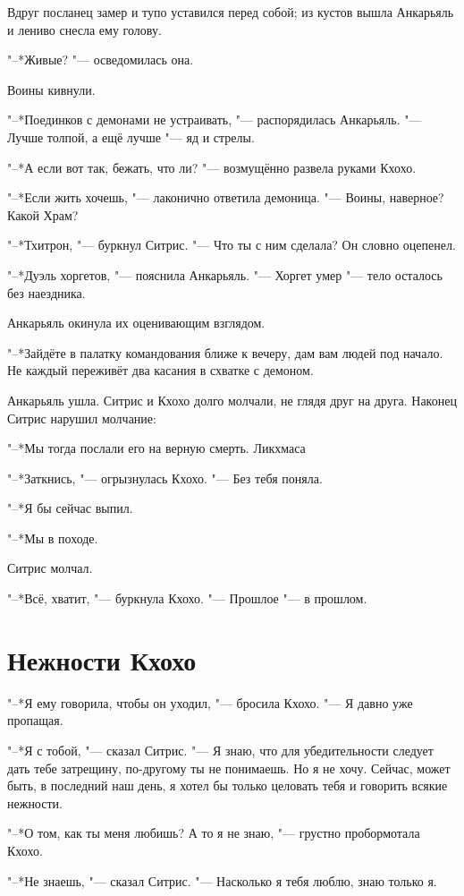 Вдруг посланец замер и тупо уставился перед собой;
из кустов вышла Анкарьяль и лениво снесла ему голову.

"--*Живые? "--- осведомилась она.

Воины кивнули.

"--*Поединков с демонами не устраивать, "--- распорядилась Анкарьяль.
"--- Лучше толпой, а ещё лучше "--- яд и стрелы.

"--*А если вот так, бежать, что ли? "--- возмущённо развела руками Кхохо.

"--*Если жить хочешь, "--- лаконично ответила демоница.
"--- Воины, наверное?
Какой Храм?

"--*Тхитрон, "--- буркнул Ситрис.
"--- Что ты с ним сделала?
Он словно оцепенел.

"--*Дуэль хоргетов, "--- пояснила Анкарьяль.
"--- Хоргет умер "--- тело осталось без наездника.

Анкарьяль окинула их оценивающим взглядом.

"--*Зайдёте в палатку командования ближе к вечеру, дам вам людей под начало.
Не каждый переживёт два касания в схватке с демоном.

Анкарьяль ушла.
Ситрис и Кхохо долго молчали, не глядя друг на друга.
Наконец Ситрис нарушил молчание:

"--*Мы тогда послали его на верную смерть.
Ликхмаса\ldotst

"--*Заткнись, "--- огрызнулась Кхохо.
"--- Без тебя поняла.

"--*Я бы сейчас выпил.

"--*Мы в походе.

Ситрис молчал.

"--*Всё, хватит, "--- буркнула Кхохо.
"--- Прошлое "--- в прошлом.

\section{Нежности Кхохо}

"--*Я ему говорила, чтобы он уходил, "--- бросила Кхохо.
"--- Я давно уже пропащая.

"--*Я с тобой, "--- сказал Ситрис.
"--- Я знаю, что для убедительности следует дать тебе затрещину, по-другому ты не понимаешь.
Но я не хочу.
Сейчас, может быть, в последний наш день, я хотел бы только целовать тебя и говорить всякие нежности.

"--*О том, как ты меня любишь?
А то я не знаю, "--- грустно пробормотала Кхохо.

"--*Не знаешь, "--- сказал Ситрис.
"--- Насколько я тебя люблю, знаю только я.

